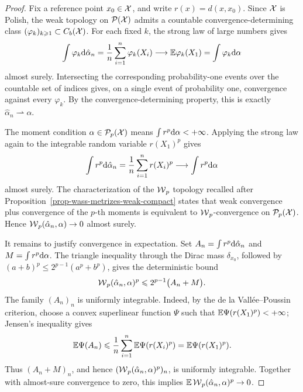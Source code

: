 \begin{proof}
	Fix a reference point \(x_0\in\mathcal{X}\), and write \(r(x)=d(x,x_0)\).  Since \(\mathcal{X}\) is Polish, the weak topology on \(\mathcal{P}(\mathcal{X})\) admits a countable convergence-determining class \((\varphi_k)_{k\geqslant1}\subset C_b(\mathcal{X})\).  For each fixed \(k\), the strong law of large numbers gives
	\[
		\int \varphi_k\mathrm{d}\hat\alpha_n
		=
		\frac1n\sum_{i=1}^n\varphi_k(X_i)
		\longrightarrow
		\mathbb{E}\varphi_k(X_1)
		=
		\int\varphi_k\mathrm{d}\alpha
	\]
	almost surely.  Intersecting the corresponding probability-one events over the countable set of indices gives, on a single event of probability one, convergence against every \(\varphi_k\).  By the convergence-determining property, this is exactly \(\hat\alpha_n\rightharpoonup\alpha\).

	The moment condition \(\alpha\in\mathcal{P}_p(\mathcal{X})\) means \(\int r^p\mathrm{d}\alpha<+\infty\).  Applying the strong law again to the integrable random variable \(r(X_1)^p\) gives
	\[
		\int r^p\mathrm{d}\hat\alpha_n
		=
		\frac1n\sum_{i=1}^n r(X_i)^p
		\longrightarrow
		\int r^p\mathrm{d}\alpha
	\]
	almost surely.  The characterization of the \(\operatorname{\mathcal{W}}_p\) topology recalled after Proposition~\ref{prop-wass-metrizes-weak-compact} states that weak convergence plus convergence of the \(p\)-th moments is equivalent to \(\operatorname{\mathcal{W}}_p\)-convergence on \(\mathcal{P}_p(\mathcal{X})\).  Hence \(\operatorname{\mathcal{W}}_p(\hat\alpha_n,\alpha)\to0\) almost surely.

	It remains to justify convergence in expectation.  Set \(A_n=\int r^p\mathrm{d}\hat\alpha_n\) and \(M=\int r^p\mathrm{d}\alpha\).  The triangle inequality through the Dirac mass \(\delta_{x_0}\), followed by \((a+b)^p\leq2^{p-1}(a^p+b^p)\), gives the deterministic bound
	\[
		\operatorname{\mathcal{W}}_p(\hat\alpha_n,\alpha)^p
		\leqslant
		2^{p-1}\big(A_n+M\big).
	\]
	The family \((A_n)_n\) is uniformly integrable.  Indeed, by the de la Vall\'ee--Poussin criterion, choose a convex superlinear function \(\Psi\) such that \(\mathbb{E}\Psi(r(X_1)^p)<+\infty\); Jensen's inequality gives
	\[
		\mathbb{E}\Psi(A_n)
		\leqslant
		\frac1n\sum_{i=1}^n \mathbb{E}\Psi(r(X_i)^p)
		=
		\mathbb{E}\Psi(r(X_1)^p).
	\]
	Thus \((A_n+M)_n\), and hence \((\operatorname{\mathcal{W}}_p(\hat\alpha_n,\alpha)^p)_n\), is uniformly integrable.  Together with almost-sure convergence to zero, this implies \(\mathbb{E}\operatorname{\mathcal{W}}_p(\hat\alpha_n,\alpha)^p\to0\).
\end{proof}

